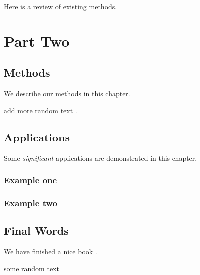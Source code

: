 \documentclass[]{book}
\theoremstyle{definition}
\theoremstyle{definition}
\theoremstyle{definition}
\theoremstyle{remark}
\begin{document}
Here is a review of existing methods.

\part{Part Two}\label{part-part-two}

\chapter{Methods}\label{methods}

We describe our methods  in this chapter.

add more random text .

\chapter{Applications}\label{applications}

Some \emph{significant} applications are demonstrated in this chapter.

\section{Example one}\label{example-one}

\section{Example two}\label{example-two}

\chapter{Final Words}\label{final-words}

We have finished a nice book .

some random  text



\printindex
\end{document}
